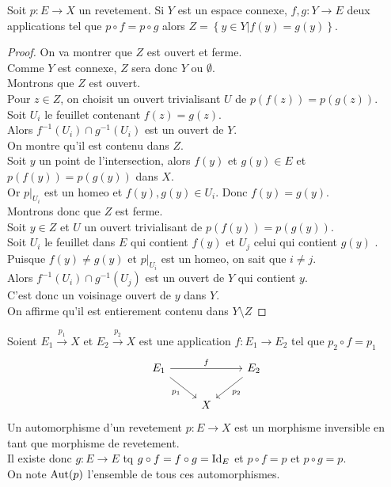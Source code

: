 \documentclass[../main.tex]{subfiles}
\begin{document}
\begin{propo}
Soit $p: E\to X$ un revetement. Si $Y$ est un espace connexe, $f,g: Y \to E$ deux applications tel que $p\circ f = p\circ g$ alors $Z= \left\{ y\in Y | f( y ) = g( y)  \right\} $.
\end{propo}
\begin{proof}
On va montrer que $Z$ est ouvert et ferme.\\
Comme $Y$ est connexe, $Z$ sera donc $Y$ ou $\emptyset$.\\
Montrons que $Z$ est ouvert.\\
Pour $z\in Z$, on choisit un ouvert trivialisant $U$ de $p( f( z) ) = p( g( z) ) $.\\
Soit $U_i$ le feuillet contenant $f( z) = g(z ) $.\\
Alors $f^{-1}( U_i)\cap g^{-1}( U_i)  $ est un ouvert de $Y$.\\
On montre qu'il est contenu dans $Z$.\\
Soit $y$ un point de l'intersection, alors $f( y) $ et $g( y) \in E	$ et $p( f( y) ) = p( g( y) ) $ dans $X$.\\
Or $p|_{U_i} $ est un homeo et $f( y) , g( y) \in U_i$. Donc $f( y) = g( y) $.\\
Montrons donc que $Z$ est ferme.\\
Soit $y\in Z$ 	et $U$ un ouvert trivialisant de $p( f( y) ) = p( g( y) ) $.\\
Soit $U_i$ le feuillet dans $E$ qui contient $f( y) $ et $U_j$ celui qui contient $g( y) $ .\\
Puisque $f( y) \neq g( y) $ et $p|_{U_i} $ est un homeo, on sait que $i \neq j$.\\
Alors $f^{-1}( U_i) \cap g^{-1}( U_j) $ est un ouvert de $Y$ qui contient $y$.\\
C'est donc un voisinage ouvert de $y$ dans $Y$.\\
On affirme qu'il est entierement contenu dans $Y\setminus Z$ 
\end{proof}
\begin{defn}
	Soient $E_1 \xrightarrow{p_1} X$ et $E_2 \xrightarrow{p_2} X$ est une application $f: E_1\to E_2$ tel que
	$p_2 \circ f = p_1$
	\[\begin{tikzcd}
	{E_1} & {} & {E_2} \\
	& X
	\arrow["f", from=1-1, to=1-3]
	\arrow["{p_1}"', from=1-1, to=2-2]
	\arrow["{p_2}", from=1-3, to=2-2]
\end{tikzcd}\]
Un automorphisme d'un revetement $p:E\to X$ est un morphisme inversible en tant que morphisme de revetement.\\
Il existe donc $g: E\to E$ tq $g\circ f = f\circ g = \operatorname{Id}_E$ et $p\circ f = p$ et $p\circ g = p$.\\
On note $\operatorname{Aut} ( p) $ l'ensemble de tous ces automorphismes.
\end{defn}
\end{document}

